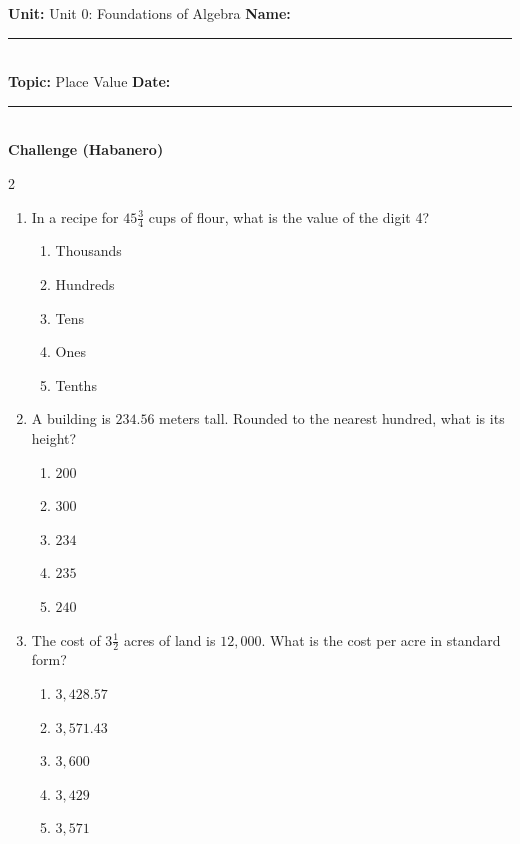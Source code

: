 \documentclass[10pt]{article}
\begin{document}
\enlargethispage{2.5cm}

\begin{tcolorbox}[colback=mainblue!5, colframe=mainblue, sharp corners, boxrule=0.5pt]
    \small \textbf{Unit:} Unit 0: Foundations of Algebra \hfill \textbf{Name:} \rule{3cm}{0.4pt} \\
    \small \textbf{Topic:} Place Value \hfill \textbf{Date:} \rule{2cm}{0.4pt} \\
    \centering \textbf{\large Challenge (Habanero)}
\end{tcolorbox}

\vspace{0.2cm}

\begin{multicols}{2}
\begin{enumerate}[label=\textbf{Q\arabic*.}, leftmargin=*, itemsep=6pt, parsep=0pt]

  \item \small In a recipe for $45 \frac{3}{4}$ cups of flour, what is the value of the digit 4?
  \begin{enumerate}[label=(\Alph*), leftmargin=0.6cm, nosep, itemsep=2pt]
    \item Thousands
    \item Hundreds
    \item Tens
    \item Ones
    \item Tenths
  \end{enumerate}

  \item \small A building is $234.56$ meters tall. Rounded to the nearest hundred, what is its height?
  \begin{enumerate}[label=(\Alph*), leftmargin=0.6cm, nosep, itemsep=2pt]
    \item $200$
    \item $300$
    \item $234$
    \item $235$
    \item $240$
  \end{enumerate}

  \item \small The cost of $3 \frac{1}{2}$ acres of land is $12,000$. What is the cost per acre in standard form?
  \begin{enumerate}[label=(\Alph*), leftmargin=0.6cm, nosep, itemsep=2pt]
    \item $3,428.57$
    \item $3,571.43$
    \item $3,600$
    \item $3,429$
    \item $3,571$
  \end{enumerate}


\end{enumerate}
\end{multicols}
\end{document}
